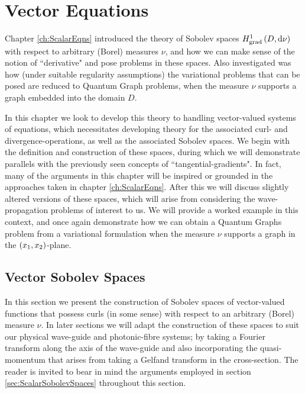 \chapter{Vector Equations} \label{ch:VectorEqns}
Chapter \ref{ch:ScalarEqns} introduced the theory of Sobolev spaces $H^1_\mathrm{grad}\left( D, \mathrm{d}\nu \right)$ with respect to arbitrary (Borel) measures $\nu$, and how we can make sense of the notion of ``derivative" and pose problems in these spaces.
Also investigated was how (under suitable regularity assumptions) the variational problems that can be posed are reduced to Quantum Graph problems, when the measure $\nu$ supports a graph embedded into the domain $D$. \newline

In this chapter we look to develop this theory to handling vector-valued systems of equations, which necessitates developing theory for the associated curl- and divergence-operations, as well as the associated Sobolev spaces.
We begin with the definition and construction of these spaces, during which we will demonstrate parallels with the previously seen concepts of ``tangential-gradients".
In fact, many of the arguments in this chapter will be inspired or grounded in the approaches taken in chapter \ref{ch:ScalarEqns}.
After this we will discuss slightly altered versions of these spaces, which will arise from considering the wave-propagation problems of interest to us.
We will provide a worked example in this context, and once again demonstrate how we can obtain a Quantum Graphs problem from a variational formulation when the measure $\nu$ supports a graph in the $\left( x_1,x_2 \right)$-plane.

\section{Vector Sobolev Spaces} \label{sec:VectorSobSpaces}
In this section we present the construction of Sobolev spaces of vector-valued functions that possess curls (in some sense) with respect to an arbitrary (Borel) measure $\nu$.
In later sections we will adapt the construction of these spaces to suit our physical wave-guide and photonic-fibre systems; by taking a Fourier transform along the axis of the wave-guide and also incorporating the quasi-momentum that arises from taking a Gelfand transform in the cross-section.
The reader is invited to bear in mind the arguments employed in section \ref{sec:ScalarSobolevSpaces} throughout this section. \newline

